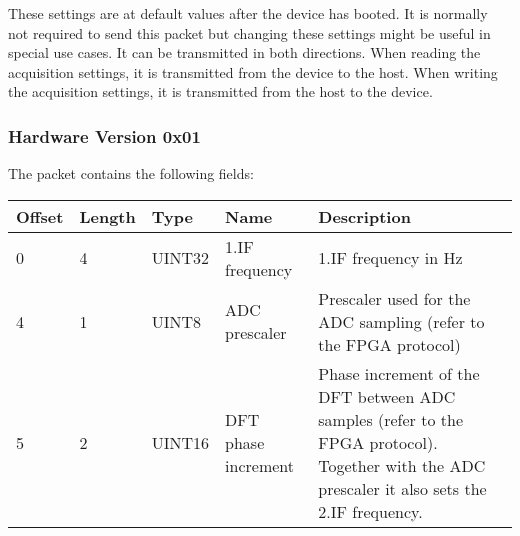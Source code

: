 \documentclass[a4paper,11pt]{article}
\begin{document}
These settings are at default values after the device has booted. It is normally not required to send this packet but changing these settings might be useful in special use cases. It can be transmitted in both directions. When reading the acquisition settings, it is transmitted from the device to the host. When writing the acquisition settings, it is transmitted from the host to the device.

\subsubsection{Hardware Version 0x01}
The packet contains the following fields:
\begin{ThreePartTable}
\setlength\tabcolsep{3pt}

\begin{longtable}{p{} |  p{}  |  p{}| p{} | p{}}
\toprule
\textbf{Offset} &\textbf{Length} &\textbf{Type} & \textbf{Name} &\textbf{Description} \\ 
\hline
\endhead
\midrule[\heavyrulewidth]
\endfoot  
\midrule[\heavyrulewidth]
\endlastfoot

0 & 4 & UINT32 & 1.IF frequency & 1.IF frequency in Hz \\
4 & 1 & UINT8 & ADC prescaler & Prescaler used for the ADC sampling (refer to the FPGA protocol) \\
5 & 2 & UINT16 & DFT phase increment & Phase increment of the DFT between ADC samples (refer to the FPGA protocol). Together with the ADC prescaler it also sets the 2.IF frequency. \\
\end{longtable}   
\end{ThreePartTable}
\end{document}
